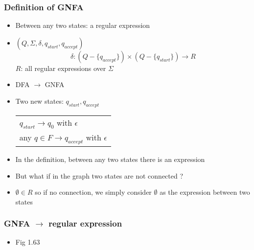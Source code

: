 




\begin{frame}[allowframebreaks] \frametitle{Definition of GNFA}
  \begin{itemize}
\item Between any two states: a regular expression
\item $(Q, \Sigma, \delta, q_{start}, q_{accept})$
  \begin{equation*}
    \delta:(Q-\{q_{accept}\})\times
(Q-\{q_{start}\})\rightarrow R
  \end{equation*}
$R$: all regular expressions over $\Sigma$



\item DFA $\rightarrow $ GNFA

\item [] Two new states: $q_{start}, q_{accept}$

  \begin{center}
    \begin{tabular}{l}
$q_{start} \rightarrow q_0$ with $\epsilon$ \\
any $q \in F \rightarrow q_{accept}$ with $\epsilon$
    \end{tabular}
\end{center}
\item In the definition, between any two states there is
  an expression

\item [] But what if in the graph two states are not connected ?

\item [] $\emptyset \in R$ so if no connection, we simply consider
  $\emptyset$ as the expression between two states
\end{itemize}\end{frame} \begin{frame}[allowframebreaks] \frametitle{GNFA $\rightarrow$ regular expression}
    \begin{itemize}
\item Fig 1.63


\end{itemize}
\end{frame}
